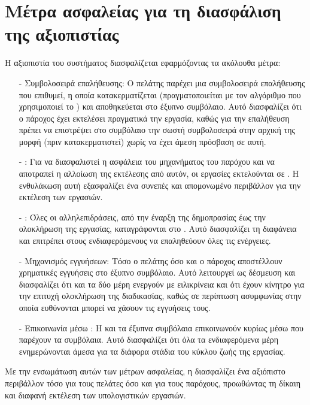 \section{Μέτρα ασφαλείας για τη διασφάλιση της αξιοπιστίας}
Η αξιοπιστία του συστήματος διασφαλίζεται εφαρμόζοντας τα ακόλουθα μέτρα:
\begin{itemize}
\item[-] Συμβολοσειρά επαλήθευσης: Ο πελάτης παρέχει μια συμβολοσειρά επαλήθευσης που επιθυμεί, η οποία κατακερματίζεται (πραγματοποιείται  με τον αλγόριθμο  που χρησιμοποιεί το ) και αποθηκεύεται στο έξυπνο συμβόλαιο. Αυτό διασφαλίζει ότι ο πάροχος έχει εκτελέσει πραγματικά την εργασία, καθώς για την επαλήθευση πρέπει να επιστρέψει στο συμβόλαιο την σωστή συμβολοσειρά στην αρχική της μορφή (πριν κατακερματιστεί) χωρίς να έχει άμεση πρόσβαση σε αυτή.
\item[-] : Για να διασφαλιστεί η ασφάλεια του μηχανήματος του παρόχου και να αποτραπεί η αλλοίωση της εκτέλεσης από αυτόν, οι εργασίες εκτελούνται σε . Η ενθυλάκωση αυτή εξασφαλίζει ένα συνεπές και απομονωμένο περιβάλλον για την εκτέλεση των εργασιών.
\item[-] : Όλες οι αλληλεπιδράσεις, από την έναρξη της δημοπρασίας έως την ολοκλήρωση της εργασίας, καταγράφονται στο . Αυτό διασφαλίζει τη διαφάνεια και επιτρέπει στους ενδιαφερόμενους να επαληθεύουν όλες τις ενέργειες. 
\item[-] Μηχανισμός εγγυήσεων:  Τόσο ο πελάτης όσο και ο πάροχος αποστέλλουν χρηματικές εγγυήσεις στο έξυπνο συμβόλαιο. Αυτό λειτουργεί ως δέσμευση και διασφαλίζει ότι και τα δύο μέρη ενεργούν με ειλικρίνεια και ότι έχουν κίνητρο για την επιτυχή ολοκλήρωση της διαδικασίας, καθώς σε περίπτωση ασυμφωνίας στην οποία ευθύνονται μπορεί να χάσουν τις εγγυήσεις τους. 
\item[-] Επικοινωνία μέσω : Η  και τα έξυπνα συμβόλαια επικοινωνούν κυρίως μέσω  που παρέχουν τα συμβόλαια. Αυτό διασφαλίζει ότι όλα τα ενδιαφερόμενα μέρη ενημερώνονται άμεσα για τα διάφορα στάδια του κύκλου ζωής της εργασίας. 
\end{itemize}

Με την ενσωμάτωση αυτών των μέτρων ασφαλείας, η  διασφαλίζει ένα αξιόπιστο περιβάλλον τόσο για τους πελάτες όσο και για τους παρόχους, προωθώντας τη δίκαιη και διαφανή εκτέλεση των υπολογιστικών εργασιών.